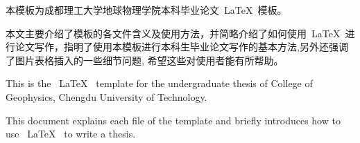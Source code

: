 \begin{cnabstract}
本模板为成都理工大学地球物理学院本科毕业论文~\LaTeX~模板。

本文主要介绍了模板的各文件含义及使用方法，并简略介绍了如何使用~\LaTeX~进行论文写作，指明了使用本模板进行本科生毕业论文写作的基本方法,另外还强调了图片表格插入的一些细节问题, 希望这些对使用者能有所帮助。

\end{cnabstract}
\vspace{1em}\par


\begin{enabstract}
This is the ~\LaTeX~ template for the undergraduate thesis of College of Geophysics, Chengdu University of Technology.

This document explains each file of the template and briefly introduces how to use ~\LaTeX~ to write a thesis.

\end{enabstract}
\vspace{1em}\par



